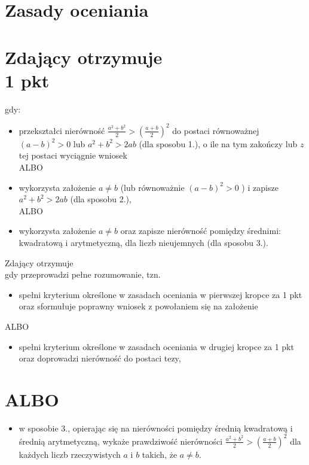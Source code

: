 \documentclass[10pt]{article}
\begin{document}
\section*{Zasady oceniania}
\section*{Zdający otrzymuje \\
 1 pkt}
gdy:

\begin{itemize}
  \item przekształci nierówność $\frac{a^{2}+b^{2}}{2}>\left(\frac{a+b}{2}\right)^{2}$ do postaci równoważnej $(a-b)^{2}>0$ lub $a^{2}+b^{2}>2 a b$ (dla sposobu 1.), o ile na tym zakończy lub $z$ tej postaci wyciągnie wniosek\\
ALBO
  \item wykorzysta założenie $a \neq b$ (lub równoważnie $(a-b)^{2}>0$ ) i zapisze $a^{2}+b^{2}>2 a b$ (dla sposobu 2.),\\
ALBO
  \item wykorzysta założenie $a \neq b$ oraz zapisze nierówność pomiędzy średnimi: kwadratową i arytmetyczną, dla liczb nieujemnych (dla sposobu 3.).
\end{itemize}

Zdający otrzymuje\\
gdy przeprowadzi pełne rozumowanie, tzn.

\begin{itemize}
  \item spełni kryterium określone w zasadach oceniania w pierwszej kropce za 1 pkt oraz sformułuje poprawny wniosek z powołaniem się na założenie
\end{itemize}

ALBO

\begin{itemize}
  \item spełni kryterium określone w zasadach oceniania w drugiej kropce za 1 pkt oraz doprowadzi nierówność do postaci tezy,
\end{itemize}

\section*{ALBO}
\begin{itemize}
  \item w sposobie 3., opierając się na nierówności pomiędzy średnią kwadratową i średnią arytmetyczną, wykaże prawdziwość nierówności $\frac{a^{2}+b^{2}}{2}>\left(\frac{a+b}{2}\right)^{2}$ dla każdych liczb rzeczywistych $a$ i $b$ takich, że $a \neq b$.
\end{itemize}
\end{document}
